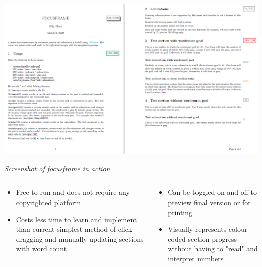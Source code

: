 \documentclass[unknownkeysallowed,usepdftitle=false, parskip=full]{beamer}
\newcommand{\secvariable}{nothing}
\begin{document}
\begin{frame}\label{\secvariable}
\centering\includegraphics[scale=0.5]{figure/readmeeg.PNG}

\tiny{\textit{Screenshot of focusframe in action}}
  \scriptsize
  \begin{columns}[t]
  \begin{column}[c]{0.6\textwidth}
    \begin{itemize}
        \vspace{-8pt}\item Free to run and does not require any copyrighted platform
        \item Costs less time to learn and implement than current simplest method of click-dragging and manually updating sections with word count
     \end{itemize}
    \end{column}
    \begin{column}[c]{0.6\textwidth}
    \parbox{\linewidth}{

    \begin{itemize}
        \item Can be toggled on and off to preview final version or for printing
        \item Visually represents colour-coded section progress without having to "read" and interpret numbers
            
        \end{itemize}
      }
    \end{column}
    
  \end{columns}
  
\end{frame}
\end{document}
